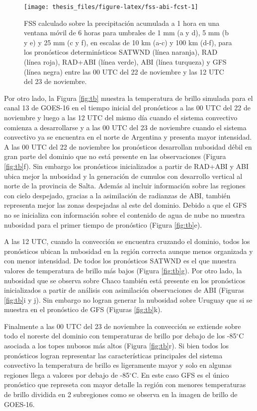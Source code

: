 \documentclass[12pt,oneside,a4paper]{reedthesis}
\begin{document}
\begin{figure}
\texttt{[image: thesis\_files/figure-latex/fss-abi-fcst-1]} \caption{FSS calculado sobre la precipitación acumulada a 1 hora en una ventana móvil de 6 horas para umbrales de 1 mm (a y d), 5 mm (b y e) y 25 mm (c y f), en escalas de 10 km (a-c) y 100 km (d-f), para los pronósticos determinísticos SATWND (línea naranja), RAD (línea roja), RAD+ABI (línea verde), ABI (línea turqueza) y GFS (línea negra) entre las 00 UTC del 22 de noviembre y las 12 UTC del 23 de noviembre.}\label{fig:fss-abi-fcst}
\end{figure}
Por otro lado, la Figura \ref{fig:tb} muestra la temperatura de brillo simulada para el canal 13 de GOES-16 en el tiempo inicial del pronósticos a las 00 UTC del 22 de noviembre y luego a las 12 UTC del mismo día cuando el sistema convectivo comienza a desarrollarse y a las 00 UTC del 23 de noviembre cuando el sistema convectivo ya se encuentra en el norte de Argentina y presenta mayor intensidad. A las 00 UTC del 22 de noviembre los pronósticos desarrollan nubosidad débil en gran parte del dominio que no está presente en las observaciones (Figura \ref{fig:tb}f). Sin embargo los pronósticos inicializados a partir de RAD+ABI y ABI ubica mejor la nubosidad y la generación de cumulos con desarrollo vertical al norte de la provincia de Salta. Además al incluir información sobre las regiones con cielo despejado, gracias a la asimilación de radianzas de ABI, también representa mejor las zonas despejadas al este del dominio. Debido a que el GFS no se inicializa con información sobre el contenido de agua de nube no muestra nubosidad para el primer tiempo de pronóstico (Figura \ref{fig:tb}e).

A las 12 UTC, cuando la convección se encuentra cruzando el dominio, todos los pronósticos ubican la nubosidad en la región correcta aunque menos organizada y con menor intensidad. De todos los pronósticos SATWND es el que muestra valores de temperatura de brillo más bajos (Figura \ref{fig:tb}g). Por otro lado, la nubosidad que se observa sobre Chaco también está presente en los pronósticos inicializados a partir de análisis con asimilación observaciones de ABI (Figuras \ref{fig:tb}i y j). Sin embargo no logran generar la nubosidad sobre Uruguay que si se muestra en el pronóstico de GFS (Figuras \ref{fig:tb}k).

Finalmente a las 00 UTC del 23 de noviembre la convección se extiende sobre todo el noreste del dominio con temperaturas de brillo por debajo de los -85\(^\circ\)C asociada a los topes nubosos más altos (Figura \ref{fig:tb}r). Si bien todos los pronósticos logran representar las características principales del sistema convectivo la temperatura de brillo es ligeramente mayor y solo en algunas regiones llega a valores por debajo de -85\(^\circ\)C. En este caso GFS es el único pronóstico que represeta con mayor detalle la región con menores temperaturas de brillo dividida en 2 subregiones como se observa en la imagen de brillo de GOES-16.
\end{document}
